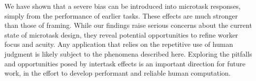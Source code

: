 \documentclass{sigchi}
\begin{document}
We have shown that a severe bias can be introduced into microtask 
responses, simply from the performance of earlier tasks. 
These effects are much stronger than those of framing.  
While our findings raise serious concerns about the 
current state of microtask design, they reveal potential opportunities 
to refine worker focus and acuity.  Any application that relies
on the repetitive use of human judgment is likely subject to the phenomena
described here.  Exploring the pitfalls and opportunities posed by
intertask effects is an important direction for future work, 
in the effort to develop performant and reliable human computation.



\end{document}
